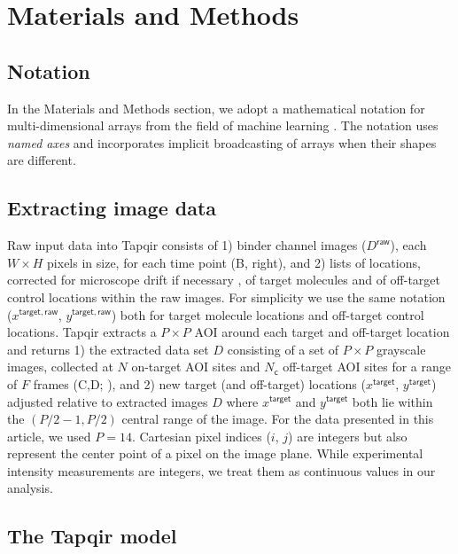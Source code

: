 \section{Materials and Methods}

\subsection{Notation} 

In the Materials and Methods section, we adopt a mathematical notation for multi-dimensional arrays from the field of machine learning  \citep{Chiang2021-fi}.  The notation uses \textit{named axes} and incorporates implicit broadcasting of arrays when their shapes are different.

\subsection{Extracting image data} 

Raw input data into Tapqir consists of 1) binder channel images ($D^\mathsf{raw}$), each $W \times H$ pixels in size, for each time point (B, right), and 2)  lists of locations, corrected for microscope drift if necessary \citep{Friedman2015-nx}, of target molecules and of off-target control locations  \citep{Friedman2015-nx} within the raw images. For simplicity we use the same notation ($x^{\mathsf{target}, \mathsf{raw}}$, $y^{\mathsf{target}, \mathsf{raw}}$) both for target molecule locations and off-target control locations. Tapqir extracts a $P \times P$ AOI around each target and off-target location and returns 1) the extracted data set $D$ consisting of a set of $P \times P$ grayscale images, collected at $N$ on-target AOI sites and $N_\mathsf{c}$  off-target AOI sites for a range of $F$ frames (C,D; ), and 2) new target (and off-target) locations ($x^\mathsf{target}$, $y^\mathsf{target}$) adjusted relative to extracted images $D$ where $x^\mathsf{target}$ and $y^\mathsf{target}$ both lie within the $(P/2-1,P/2)$ central range of the image. For the data presented in this article, we used $P = 14$. Cartesian pixel indices ($i$, $j$) are integers but also represent the center point of a pixel on the image plane. While experimental intensity measurements are integers, we treat them as continuous values in our analysis.



\subsection{The Tapqir model} 

